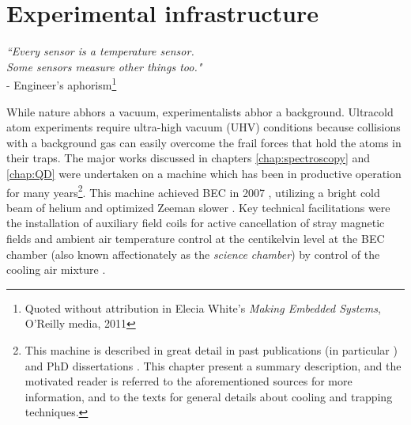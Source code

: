 
\chapter{Experimental infrastructure}
\label{chap:exp}
	\begin{adjustwidth}{0cm}{0cm}
	\begin{flushright}
	\emph{``Every sensor is a temperature sensor.\\
	 Some sensors measure other things too."\\} 
	- Engineer's aphorism\footnote{Quoted without attribution in Elecia White's \emph{Making Embedded Systems}, O'Reilly media, 2011}
	\end{flushright}
	\end{adjustwidth}
	{While} nature abhors a vacuum, experimentalists abhor a background.
	Ultracold atom experiments require ultra-high vacuum (UHV) conditions because collisions with a background gas can easily overcome the frail forces that hold the atoms in their traps.
	The major works discussed in chapters \ref{chap:spectroscopy} and \ref{chap:QD} were undertaken on a machine which has been in productive operation for many years\footnote{This machine is described in great detail in past publications (in particular \cite{Swansson04,Dall07_BEC}) and PhD dissertations \cite{HodgmanThesis,ManningThesis,ShinThesis,DallThesis}.
	This chapter present a summary description, and the motivated reader is referred to the aforementioned sources for more information, and to the texts \cite{FootAtomic,MetVdS} for general details about cooling and trapping techniques.}.
	This machine achieved BEC in 2007 \cite{Dall07_BEC}, utilizing a bright cold beam of helium \cite{Swansson04} and optimized Zeeman slower \cite{Dedman04}.
	Key technical facilitations were the installation of auxiliary field coils for active cancellation of stray magnetic fields \cite{Dedman04} and ambient air temperature control at the centikelvin level at the BEC chamber (also known affectionately as the \emph{science chamber}) by control of the cooling air mixture \cite{Dedman15}.
